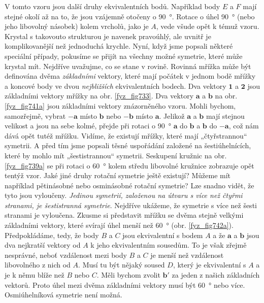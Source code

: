 {    V tomto vzoru jsou další druhy ekvivalentních bodů. Například body \(E\) a \(F\) mají stejné 
    okolí až na to, že jsou vzájemně otočeny o \SI{90}{\degree}. Rotace o úhel \SI{90}{\degree} 
    (nebo jeho libovolný násobek) kolem vrcholů, jako je \(A\), vede všude opět k témuž vzoru. 
    Krystal s takovouto strukturou je navenek pravoúhlý, ale uvnitř je komplikovanější než 
    jednoduchá krychle. Nyní, když jsme popsali některé speciální případy, pokusíme se přijít na 
    všechny možné symetrie, které může krystal mít. Nejdříve uvažujme, co se stane v rovině. 
    Rovinná mřížka může být definována dvěma \emph{základními} vektory, které mají počátek v jednom 
    bodě mřížky a koncové body ve dvou \emph{nejbližších} ekvivalentních bodech. Dva vektory 
    \(\bm{1}\) a \(\bm{2}\) jsou základními vektory mřížky na obr. \ref{fyz_fig733}. Dva vektory 
    \(\bm{a}\) a \(\bm{b}\) na obr. \ref{fyz_fig741a} jsou základními vektory znázorněného vzoru. 
    Mohli bychom, samozřejmě, vybrat \(\bm{-a}\) místo \(\bm{b}\) nebo \(\bm{-b}\) místo 
    \(\bm{a}\). Jelikož \(\bm{a}\) a \(\bm{b}\) mají stejnou velikost a jsou na sebe kolmé, přejde 
    při rotaci o \SI{90}{\degree} \(\bm{a}\) do \(\bm{b}\) a \(\bm{b}\) do \(\bm{-a}\), což nám 
    dává opět tutéž mřížku. Vidíme, že existují mřížky, které mají „čtyřstrannou“ symetrii. A před 
    tím jsme popsali těsné uspořádání založené na šestiúhelnících, které by mohlo mít 
    „šestistrannou“ symetrii. Seskupení kružnic na obr. \ref{fyz_fig739a} se při rotaci o 
    \SI{60}{\degree} kolem středu libovolné kružnice zobrazuje opět tentýž vzor. Jaké jiné druhy 
    rotační symetrie ještě existují? Můžeme mít například pětinásobné nebo osminásobné rotační 
    symetrie? Lze snadno vidět, že tyto jsou vyloučeny.\emph{ Jedinou symetrií, založenou na útvaru 
    s více než čtyřmi stranami, je šestistranná symetrie}. Nejdříve ukážeme, že symetrie s více než 
    šesti stranami je vyloučena. Zkusme si představit mřížku se dvěma stejně velkými základními 
    vektory, které svírají úhel menší než \SI{60}{\degree} (obr. \ref{fyz_fig742a}). Předpokládáme, 
    tedy, že body \(B\) a \(C\) jsou ekvivalentní s bodem \(A\) a že \(\bm{a}\) a \(\bm{b}\) jsou 
    dva nejkratší vektory od \(A\) k jeho ekvivalentním sousedům. To je však zřejmě nesprávné, 
    neboť vzdálenost mezi body \(B\) a \(C\) je menší než vzdálenost libovolného z nich od \(A\). 
    Musí tu být nějaký soused \(D\), který je ekvivalentní s \(A\) a je k němu blíže než \(B\) nebo 
    \(C\). Měli bychom zvolit \(\bm{b'}\) za jeden z našich základních vektorů. Proto úhel mezi 
    dvěma základními vektory musí být \SI{60}{\degree} nebo více. Osmiúhelníková symetrie není 
    možná.

}
